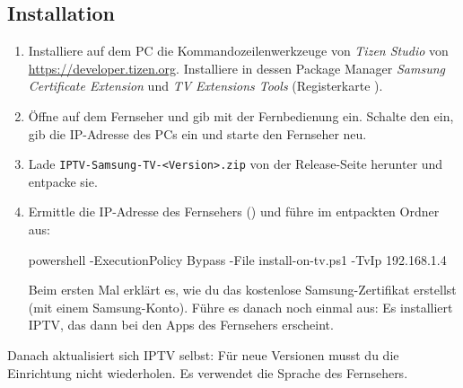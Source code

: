 \subsection{Installation}
\begin{enumerate}
  \item Installiere auf dem PC die Kommandozeilenwerkzeuge von \emph{Tizen
        Studio} von \url{https://developer.tizen.org}. Installiere in dessen
        Package Manager \emph{Samsung Certificate Extension} und \emph{TV
        Extensions Tools} (Registerkarte ).
  \item Öffne auf dem Fernseher  und gib mit der Fernbedienung
         ein. Schalte den
         ein, gib die IP-Adresse des PCs ein und
        starte den Fernseher neu.
  \item Lade \texttt{IPTV-Samsung-TV-\textless Version\textgreater.zip} von
        der Release-Seite herunter und entpacke sie.
  \item Ermittle die IP-Adresse des Fernsehers () und führe im entpackten Ordner aus:
\begin{center}
\begin{minipage}{0.92\linewidth}
\small\ttfamily powershell -ExecutionPolicy Bypass -File install-on-tv.ps1 -TvIp 192.168.1.4
\end{minipage}
\end{center}
        Beim ersten Mal erklärt es, wie du das kostenlose Samsung-Zertifikat
        erstellst (mit einem Samsung-Konto). Führe es danach noch einmal aus:
        Es installiert IPTV, das dann bei den Apps des Fernsehers erscheint.
\end{enumerate}
Danach aktualisiert sich IPTV selbst: Für neue Versionen musst du die
Einrichtung nicht wiederholen. Es verwendet die Sprache des Fernsehers.

